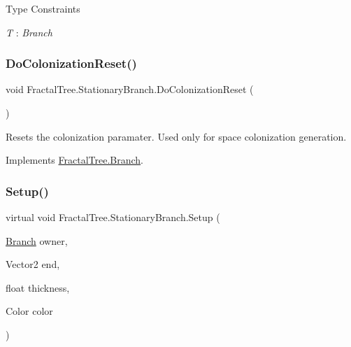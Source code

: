 \begin{Desc}
\item[Type Constraints]\begin{description}
\item[{\em T} : {\em Branch}]\end{description}
\end{Desc}
\hypertarget{class_fractal_tree_1_1_stationary_branch_a57a5b1cbc9fd081c5b8cb41b61d24502}{}\label{class_fractal_tree_1_1_stationary_branch_a57a5b1cbc9fd081c5b8cb41b61d24502} 
\subsubsection{\texorpdfstring{Do\+Colonization\+Reset()}{DoColonizationReset()}}
{\footnotesize\ttfamily void Fractal\+Tree.\+Stationary\+Branch.\+Do\+Colonization\+Reset (\begin{DoxyParamCaption}{ }\end{DoxyParamCaption})}



Resets the colonization paramater. Used only for space colonization generation. 



Implements \hyperlink{interface_fractal_tree_1_1_branch_a4460379e72ec587f890b1e0cf77dbc3c}{Fractal\+Tree.\+Branch}.

\hypertarget{class_fractal_tree_1_1_stationary_branch_acaa0bef74389db9f1a2f57af38557000}{}\label{class_fractal_tree_1_1_stationary_branch_acaa0bef74389db9f1a2f57af38557000} 
\subsubsection{\texorpdfstring{Setup()}{Setup()}\hspace{0.1cm}{\footnotesize\ttfamily [1/4]}}
{\footnotesize\ttfamily virtual void Fractal\+Tree.\+Stationary\+Branch.\+Setup (\begin{DoxyParamCaption}\item[{\hyperlink{interface_fractal_tree_1_1_branch}{Branch}}]{owner,  }\item[{Vector2}]{end,  }\item[{float}]{thickness,  }\item[{Color}]{color }\end{DoxyParamCaption})\hspace{0.3cm}{\ttfamily [virtual]}}



